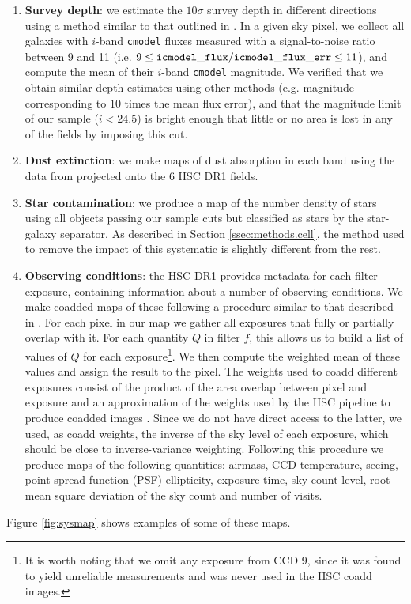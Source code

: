 \documentclass[a4paper,11pt]{article}
\begin{document}
    \begin{enumerate}
      \item {\bf Survey depth}: we estimate the $10\sigma$ survey depth in different directions using a method similar to that outlined in \cite{2018PASJ...70S..25M}. In a given sky pixel, we collect all galaxies with $i$-band {\tt cmodel} fluxes measured with a signal-to-noise ratio between 9 and 11 (i.e. $9\le{\tt icmodel\_flux}/{\tt icmodel\_flux\_err}\le11$), and compute the mean of their $i$-band  {\tt cmodel} magnitude. We verified that we obtain similar depth estimates using other methods (e.g. magnitude corresponding to $10$ times the mean flux error), and that the magnitude limit of our sample ($i<24.5$) is bright enough that little or no area is lost in any of the fields by imposing this cut.
      \item {\bf Dust extinction}: we make maps of dust absorption in each band using the data from \cite{1998ApJ...500..525S} projected onto the 6 HSC DR1 fields.
      \item {\bf Star contamination}: we produce a map of the number density of stars using all objects passing our sample cuts but classified as stars by the star-galaxy separator. As described in Section \ref{ssec:methods.cell}, the method used to remove the impact of this systematic is slightly different from the rest.
      \item {\bf Observing conditions}: the HSC DR1 provides metadata for each filter exposure, containing information about a number of observing conditions. We make coadded maps of these following a procedure similar to that described in \cite{2016ApJS..226...24L}. For each pixel in our map we gather all exposures that fully or partially overlap with it. For each quantity $Q$ in filter $f$, this allows us to build a list of values of $Q$ for each exposure\footnote{It is worth noting that we omit any exposure from CCD 9, since it was found to yield unreliable measurements and was never used in the HSC coadd images.}. We then compute the weighted mean of these values and assign the result to the pixel. The weights used to coadd different exposures consist of the product of the area overlap between pixel and exposure and an approximation of the weights used by the HSC pipeline to produce coadded images \cite{2018PASJ...70S...5B}. Since we do not have direct access to the latter, we used, as coadd weights, the inverse of the sky level of each exposure, which should be close to inverse-variance weighting. Following this procedure we produce maps of the following quantities: airmass, CCD temperature, seeing, point-spread function (PSF) ellipticity, exposure time, sky count level, root-mean square deviation of the sky count and number of visits.
    \end{enumerate}
    Figure \ref{fig:sysmap} shows examples of some of these maps.
    
\end{document}
